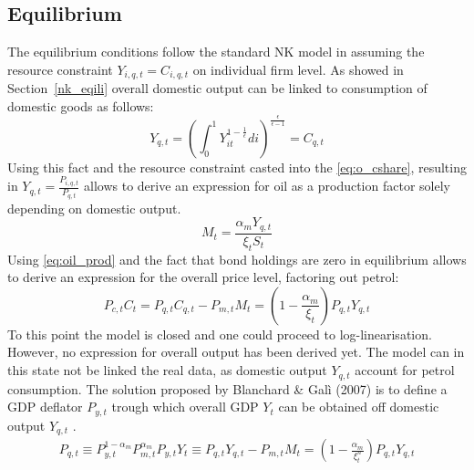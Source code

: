 \documentclass[12pt,a4paper,english]{article} %
\begin{document}
	\subsection{Equilibrium}
	The equilibrium conditions follow the standard NK model in assuming the resource constraint $Y_{i,q,t} = C_{i,q,t}$ on individual firm level. As showed in Section~\ref{nk_eqili} overall domestic output can be linked to consumption of domestic goods as follows: 
	\begin{equation}
		Y_{q,t} = \left( \int_{0}^{1} Y_{it}^{1-\frac{1}{\epsilon}} di \right)^{\frac{\epsilon}{\epsilon - 1}} = C_{q,t}
	\end{equation}
	Using this fact and the resource constraint casted into the \eqref{eq:o_cshare}, resulting in $Y_{q,t} = \frac{P_{i,q,t}}{P_{q,t}}$ allows to derive an expression for oil as a production factor solely depending on domestic output.
	\begin{equation} \label{eq:oil_prod}
		M_t = \frac{\alpha_m Y_{q,t}}{\xi_{t} S_t}
	\end{equation}
	Using \eqref{eq:oil_prod} and the fact that bond holdings are zero in equilibrium allows to derive an expression for the overall price level, factoring out petrol:
	\begin{equation}
		P_{c,t}C_t = P_{q,t} C_{q,t} - P_{m,t}M_t = \left(1 - \frac{\alpha_m}{\xi_t} \right) P_{q,t} Y_{q,t}
	\end{equation}
	To this point the model is closed and one could proceed to log-linearisation.
	However, no expression for overall output has been derived yet. The model can in this state not be linked the real data, as domestic output $Y_{q,t}$ account for petrol consumption. The solution proposed by Blanchard \& Galì (2007) is to define a GDP deflator $P_{y,t}$ trough which overall GDP $Y_t$ can be obtained off domestic output $Y_{q,t}$ \cite{blanchard_macroeconomic_2007}.
	\begin{equation}
		\begin{aligned}
		P_{q,t} \equiv P_{y,t}^{1-\alpha_m} P_{m,t}^{\alpha_m}
		P_{y,t} Y_t \equiv P_{q,t} Y_{q,t} - P_{m,t} M_t = \left( 1 - \frac{\alpha_m}{\xi_t^n} \right) P_{q,t} Y_{q,t}
		\end{aligned}
	\end{equation}
		
\end{document}
